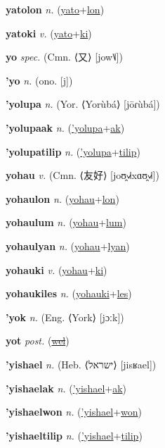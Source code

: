 \textbf{\hypertarget{yatolon}{yatolon}} \textit{n.} (\hyperlink{yato}{yato}+\allowbreak \hyperlink{lon}{lon})


\textbf{\hypertarget{yatoki}{yatoki}} \textit{v.} (\hyperlink{yato}{yato}+\allowbreak \hyperlink{ki}{ki})


\textbf{\hypertarget{yo}{yo}} \textit{spec.} (Cmn. ⟨{\chinese{}又}⟩ [jow˥˩])


\textbf{\hypertarget{'yo}{'yo}} \textit{n.} (ono. [j])


\textbf{\hypertarget{'yolupa}{'yolupa}} \textit{n.} (Yor. ⟨Yorùbá⟩ [jōɾùbá])


\textbf{\hypertarget{'yolupaak}{'yolupaak}} \textit{n.} (\hyperlink{'yolupa}{'yolupa}+\allowbreak \hyperlink{ak}{ak})


\textbf{\hypertarget{'yolupatilip}{'yolupatilip}} \textit{n.} (\hyperlink{'yolupa}{'yolupa}+\allowbreak \hyperlink{tilip}{tilip})


\textbf{\hypertarget{yohau}{yohau}} \textit{v.} (Cmn. ⟨{\chinese{}友好}⟩ [joʊ̯˧˩˧xɑʊ̯˧˩˧])


\textbf{\hypertarget{yohaulon}{yohaulon}} \textit{n.} (\hyperlink{yohau}{yohau}+\allowbreak \hyperlink{lon}{lon})


\textbf{\hypertarget{yohaulum}{yohaulum}} \textit{n.} (\hyperlink{yohau}{yohau}+\allowbreak \hyperlink{lum}{lum})


\textbf{\hypertarget{yohaulyan}{yohaulyan}} \textit{n.} (\hyperlink{yohau}{yohau}+\allowbreak \hyperlink{lyan}{lyan})


\textbf{\hypertarget{yohauki}{yohauki}} \textit{v.} (\hyperlink{yohau}{yohau}+\allowbreak \hyperlink{ki}{ki})


\textbf{\hypertarget{yohaukiles}{yohaukiles}} \textit{n.} (\hyperlink{yohauki}{yohauki}+\allowbreak \hyperlink{les}{les})


\textbf{\hypertarget{'yok}{'yok}} \textit{n.} (Eng. ⟨York⟩ [jɔːk])


\textbf{\hypertarget{yot}{yot}} \textit{post.} (\hyperlink{wel}{\sout{wel}})


\textbf{\hypertarget{'yishael}{'yishael}} \textit{n.} (Heb. ⟨{\hebrew{}ישראל}⟩ [jisʁael])


\textbf{\hypertarget{'yishaelak}{'yishaelak}} \textit{n.} (\hyperlink{'yishael}{'yishael}+\allowbreak \hyperlink{ak}{ak})


\textbf{\hypertarget{'yishaelwon}{'yishaelwon}} \textit{n.} (\hyperlink{'yishael}{'yishael}+\allowbreak \hyperlink{won}{won})


\textbf{\hypertarget{'yishaeltilip}{'yishaeltilip}} \textit{n.} (\hyperlink{'yishael}{'yishael}+\allowbreak \hyperlink{tilip}{tilip})


